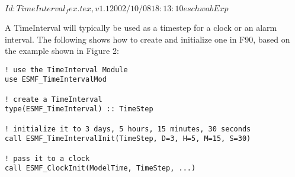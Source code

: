 $Id: TimeInterval_fex.tex,v 1.1 2002/10/08 18:13:10 eschwab Exp $

A TimeInterval will typically be used as a timestep for a clock or an alarm
interval.  The following shows how to create and initialize one in F90, based
on the example shown in Figure 2:

\begin{verbatim}
! use the TimeInterval Module
use ESMF_TimeIntervalMod

! create a TimeInterval
type(ESMF_TimeInterval) :: TimeStep

! initialize it to 3 days, 5 hours, 15 minutes, 30 seconds
call ESMF_TimeIntervalInit(TimeStep, D=3, H=5, M=15, S=30)

! pass it to a clock
call ESMF_ClockInit(ModelTime, TimeStep, ...)
\end{verbatim}
